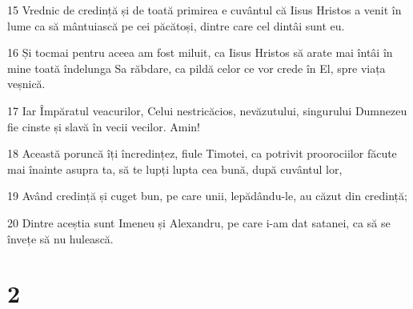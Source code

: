 \par 15 Vrednic de credință și de toată primirea e cuvântul că Iisus Hristos a venit în lume ca să mântuiască pe cei păcătoși, dintre care cel dintâi sunt eu.
\par 16 Și tocmai pentru aceea am fost miluit, ca Iisus Hristos să arate mai întâi în mine toată îndelunga Sa răbdare, ca pildă celor ce vor crede în El, spre viața veșnică.
\par 17 Iar Împăratul veacurilor, Celui nestricăcios, nevăzutului, singurului Dumnezeu fie cinste și slavă în vecii vecilor. Amin!
\par 18 Această poruncă îți încredințez, fiule Timotei, ca potrivit proorociilor făcute mai înainte asupra ta, să te lupți lupta cea bună, după cuvântul lor,
\par 19 Având credință și cuget bun, pe care unii, lepădându-le, au căzut din credință;
\par 20 Dintre aceștia sunt Imeneu și Alexandru, pe care i-am dat satanei, ca să se învețe să nu hulească.

\chapter{2}

